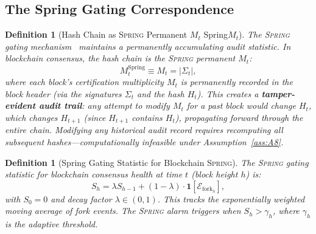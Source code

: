 \documentclass[11pt,a4paper]{article}
\newtheorem{definition}[theorem]{Definition}
\theoremstyle{definition}
\newcommand{\Spring}{\textsc{Spring}}
\newcommand{\ind}[1]{\mathbf{1}[#1]}
\newcommand{\forkEvent}{\mathcal{E}_{\mathrm{fork}}}
\begin{document}
\subsection{The Spring Gating Correspondence}
\begin{definition}[Hash Chain as \Spring{} Permanent $M_t$ Spring$M_t$]
\label{def:spring_hash}
The \Spring{} gating mechanism~\cite{SCX2025} maintains a permanently accumulating audit statistic. In blockchain consensus, the hash chain \textit{is} the \Spring{} permanent $M_t$:
\begin{equation}
    M_t^{\mathrm{Spring}} \equiv M_t = |\Sigma_t|,
    \label{eq:spring_Mt}
\end{equation}
where each block's certification multiplicity $M_t$ is permanently recorded in the block header (via the signatures $\Sigma_t$ and the hash $H_t$). This creates a \textbf{tamper-evident audit trail}: any attempt to modify $M_t$ for a past block would change $H_t$, which changes $H_{t+1}$ (since $H_{t+1}$ contains $H_t$), propagating forward through the entire chain. Modifying any historical audit record requires recomputing all subsequent hashes—computationally infeasible under Assumption~\ref{ass:A8}.
\end{definition}
\begin{definition}[Spring Gating Statistic for Blockchain \Spring{}]
\label{def:spring_stat_blockchain}
The \Spring{} gating statistic for blockchain consensus health at time $t$ (block height $h$) is:
\begin{equation}
    S_h = \lambda S_{h-1} + (1 - \lambda) \cdot \ind{\forkEvent_h},
    \label{eq:spring_stat_blockchain}
\end{equation}
with $S_0 = 0$ and decay factor $\lambda \in (0, 1)$. This tracks the exponentially weighted moving average of fork events. The \Spring{} alarm triggers when $S_h > \gamma_h$, where $\gamma_h$ is the adaptive threshold.
\end{definition}
\end{document}
